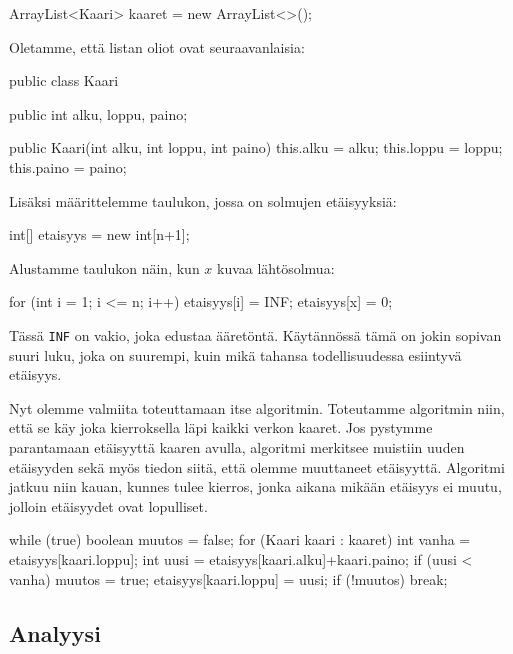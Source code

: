 \begin{code}
ArrayList<Kaari> kaaret = new ArrayList<>();
\end{code}

Oletamme, että listan oliot ovat seuraavanlaisia:

\begin{code}
public class Kaari {
    public int alku, loppu, paino;

    public Kaari(int alku, int loppu, int paino) {
        this.alku = alku;
        this.loppu = loppu;
        this.paino = paino;
    }
}
\end{code}

Lisäksi määrittelemme taulukon,
jossa on solmujen etäisyyksiä:

\begin{code}
int[] etaisyys = new int[n+1];
\end{code}

Alustamme taulukon näin, kun $x$ kuvaa lähtösolmua:

\begin{code}
for (int i = 1; i <= n; i++) {
    etaisyys[i] = INF;
}
etaisyys[x] = 0;
\end{code}

Tässä \texttt{INF} on vakio, joka edustaa ääretöntä.
Käytännössä tämä on jokin sopivan suuri luku,
joka on suurempi, kuin mikä tahansa todellisuudessa
esiintyvä etäisyys.

Nyt olemme valmiita toteuttamaan itse algoritmin.
Toteutamme algoritmin niin, että se käy joka kierroksella
läpi kaikki verkon kaaret.
Jos pystymme parantamaan etäisyyttä kaaren avulla,
algoritmi merkitsee muistiin uuden etäisyyden sekä
myös tiedon siitä, että olemme muuttaneet etäisyyttä.
Algoritmi jatkuu niin kauan, kunnes tulee kierros,
jonka aikana mikään etäisyys ei muutu,
jolloin etäisyydet ovat lopulliset.

\begin{code}
while (true) {
    boolean muutos = false;
    for (Kaari kaari : kaaret) {
        int vanha = etaisyys[kaari.loppu];
        int uusi = etaisyys[kaari.alku]+kaari.paino;
        if (uusi < vanha) {
            muutos = true;
            etaisyys[kaari.loppu] = uusi;
        }
    }
    if (!muutos) break;
}
\end{code}


\subsection{Analyysi}

